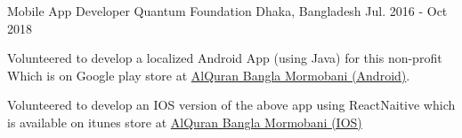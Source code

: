 

\begin{cventries}

  \cventry
    {Mobile App Developer} %
    {Quantum Foundation} %
    {Dhaka, Bangladesh} %
    {Jul. 2016 - Oct 2018} %
    {
      \begin{cvitems} %
        \item {Volunteered to develop a localized Android App (using Java) for this non-profit Which is on Google play store at \href{https://play.google.com/store/apps/details?id=quantum.org.quran}{\color{blue}AlQuran Bangla Mormobani (Android)}.}
        \item {Volunteered to develop an IOS version of the above app using ReactNaitive which is available on itunes store at \href{https://itunes.apple.com/us/app/al-quran-bangla-mormobani/id1229434136?mt=8}{\color{blue}AlQuran Bangla Mormobani (IOS)}}
      \end{cvitems}
    }

\end{cventries}
